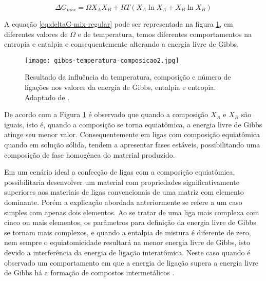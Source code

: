 \begin{equation} 
\Delta G_{mix} = \Omega X_{A}X_{B} + RT(X_{A}\ln X_{A} + X_{B}\ln X_{B})
\label{eq:deltaG-mix-regular}
\end{equation}


A equação \ref{eq:deltaG-mix-regular} pode ser representada na figura \ref{fig:gibbs-temperatura-composicao}, em diferentes valores de $\Omega$ e de temperatura, temos diferentes comportamentos na entropia e entalpia e consequentemente alterando a energia livre de Gibbs. 

\begin{figure}[ht]
    \centering
    \texttt{[image: gibbs-temperatura-composicao2.jpg]} 
    \caption{Resultado da influência da temperatura, composição e número de ligações nos valores da energia de Gibbs, entalpia e entropia. Adaptado de \cite{porter2009phase}.}
    \label{fig:gibbs-temperatura-composicao}
\end{figure}

\pagebreak

De acordo com a Figura \ref{fig:gibbs-temperatura-composicao} é observado que quando a composição $X_{A}$ e $X_{B}$ são iguais, isto é, quando a composição se torna equiatômica, a energia livre de Gibbs atinge seu menor valor. Consequentemente em ligas com composição equiatômica quando em solução sólida, tendem a apresentar fases estáveis, possibilitando uma composição de fase homogênea do material produzido.

Em um cenário ideal a confecção de ligas com a composição equiatômica, possibilitaria desenvolver um material com propriedades significativamente superiores aos materiais de ligas convencionais de uma matriz com elemento dominante. Porém a explicação abordada anteriormente se refere a um caso simples com apenas dois elementos. Ao se tratar de uma liga mais complexa com cinco ou mais elementos, os parâmetros para definição da energia livre de Gibbs se tornam mais complexos, e quando a entalpia de mistura é diferente de zero, nem sempre o equiatomicidade resultará na menor energia livre de Gibbs, isto devido a interferência da energia de ligação interatômica. Neste caso quando é observado um comportamento em que a energia de ligação supera a energia livre de Gibbs  há a formação de compostos intermetálicos \cite{porter2009phase}.
